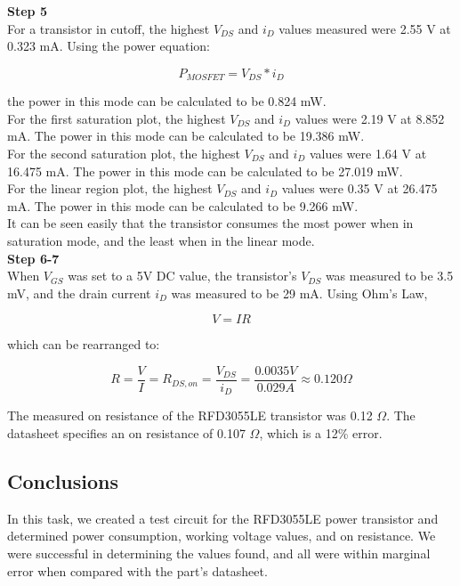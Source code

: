 \documentclass[notitlepage, 12pt]{report}  %
\begin{document}
\textbf{Step 5} \\

For a transistor in cutoff, the highest $V_{DS}$ and $i_D$ values measured were 2.55 V at 0.323 mA. 
Using the power equation: 

\begin{equation}
    P_{MOSFET} = V_{DS} * i_D
\end{equation}

the power in this mode can be calculated to be 0.824 mW. \\

For the first saturation plot, the highest $V_{DS}$ and $i_D$ values were 2.19 V at 8.852 mA. 
The power in this mode can be calculated to be 19.386 mW. \\

For the second saturation plot, the highest $V_{DS}$ and $i_D$ values were 1.64 V at 16.475 mA. 
The power in this mode can be calculated to be 27.019 mW. \\

For the linear region plot, the highest $V_{DS}$ and $i_D$ values were 0.35 V at 26.475 mA. 
The power in this mode can be calculated to be 9.266 mW. \\

It can be seen easily that the transistor consumes the most power when in saturation mode, and the least when in 
the linear mode. \\


\textbf{Step 6-7}\\
When $V_{GS}$ was set to a 5V DC value, the transistor's $V_{DS}$ was measured to be 3.5 mV, and the drain current $i_D$ 
was measured to be 29 mA. Using Ohm's Law,

\begin{equation}
    V = IR
\end{equation}

which can be rearranged to:

\begin{equation}
    R = \frac{V}{I} = R_{DS,on} = \frac{V_{DS}}{i_D} = \frac{0.0035 V}{0.029 A} \approx 0.120 \Omega
\end{equation}

The measured on resistance of the RFD3055LE transistor was 0.12 $\Omega$. The datasheet specifies an on resistance of
0.107 $\Omega$, which is a 12\% error. \\


\subsection*{Conclusions}
\indent\indent In this task, we created a test circuit for the RFD3055LE power transistor and determined power consumption,
working voltage values, and on resistance. We were successful in determining the values found, and all were within marginal error
when compared with the part's datasheet. \\
\end{document}
